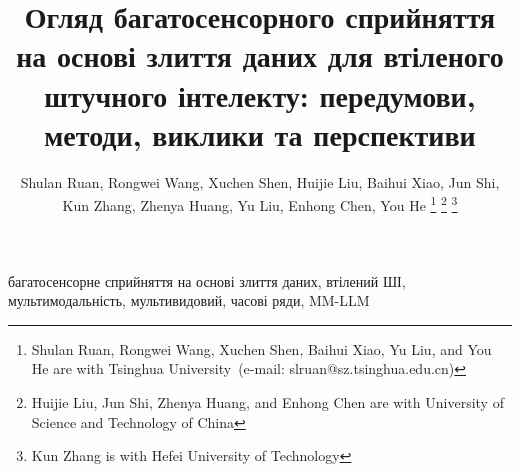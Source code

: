 \documentclass[lettersize,journal]{IEEEtran}
\begin{document}
\title{Огляд багатосенсорного сприйняття на основі злиття даних для втіленого штучного інтелекту: передумови, методи, виклики та перспективи}


\author{Shulan Ruan, Rongwei Wang, Xuchen Shen, Huijie Liu, Baihui Xiao, Jun Shi,\\ Kun Zhang, Zhenya Huang, Yu Liu, Enhong Chen, You He%
\thanks{Shulan Ruan, Rongwei Wang, Xuchen Shen, Baihui Xiao, Yu Liu, and You He are with Tsinghua University~(e-mail: slruan@sz.tsinghua.edu.cn)}%
\thanks{Huijie Liu, Jun Shi, Zhenya Huang, and Enhong Chen are with University of Science and Technology of China}
\thanks{Kun Zhang is with  Hefei University of Technology}
}

\maketitle



\begin{IEEEkeywords}
багатосенсорне сприйняття на основі злиття даних, втілений ШІ, мультимодальність, мультивидовий, часові ряди, MM-LLM
\end{IEEEkeywords}













\vfill
\end{document}

